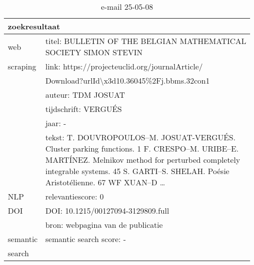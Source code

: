 \begin{table}[h!]
    \caption{e-mail 25-05-08}
    \centering
    \begin{tabularx}{\textwidth}{|p{4cm}|X|} 
        \hline
        \multicolumn{2}{|X|}{\textbf{zoekresultaat}} \\
        \hline
        web &titel: BULLETIN OF THE BELGIAN MATHEMATICAL SOCIETY SIMON STEVIN\\
        scraping&link: https://projecteuclid.org/journalArticle/\\&Download?urlId\textbackslash x3d10.36045\%2Fj.bbms.32con1\\
        &auteur: TDM JOSUAT\\
        &tijdschrift: VERGUÉS\\
        &jaar: -\\
        &tekst: T. DOUVROPOULOS–M. JOSUAT-VERGUÉS. Cluster parking functions. 1 F. CRESPO–M. URIBE–E. MARTÍNEZ. Melnikov method for perturbed completely integrable systems. 45 S. GARTI–S. SHELAH. Poésie Aristotélienne. 67 WF XUAN–D …\\
        \hline
        NLP&relevantiescore: 0\\
        \hline
        DOI&DOI: 10.1215/00127094-3129809.full\\
        &bron: webpagina van de publicatie\\
        \hline
        semantic&semantic search score: -\\
        search&\\
        \hline
    \end{tabularx}
    \label{table:email20250508}
\end{table}

